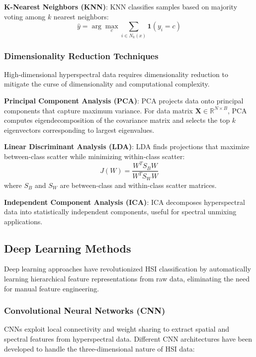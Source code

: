 \documentclass[journal]{IEEEtran}
\begin{document}
\textbf{K-Nearest Neighbors (KNN)}: KNN classifies samples based on majority voting among $k$ nearest neighbors:
\begin{equation}
\hat{y} = \arg\max_{c} \sum_{i \in N_k(x)} \mathbf{1}(y_i = c)
\end{equation}

\subsubsection{Dimensionality Reduction Techniques}

High-dimensional hyperspectral data requires dimensionality reduction to mitigate the curse of dimensionality and computational complexity.

\textbf{Principal Component Analysis (PCA)}: PCA projects data onto principal components that capture maximum variance. For data matrix $\mathbf{X} \in \mathbb{R}^{N \times B}$, PCA computes eigendecomposition of the covariance matrix and selects the top $k$ eigenvectors corresponding to largest eigenvalues.

\textbf{Linear Discriminant Analysis (LDA)}: LDA finds projections that maximize between-class scatter while minimizing within-class scatter:
\begin{equation}
J(W) = \frac{W^T S_B W}{W^T S_W W}
\end{equation}
where $S_B$ and $S_W$ are between-class and within-class scatter matrices.

\textbf{Independent Component Analysis (ICA)}: ICA decomposes hyperspectral data into statistically independent components, useful for spectral unmixing applications.

\subsection{Deep Learning Methods}

Deep learning approaches have revolutionized HSI classification by automatically learning hierarchical feature representations from raw data, eliminating the need for manual feature engineering.

\subsubsection{Convolutional Neural Networks (CNN)}

CNNs exploit local connectivity and weight sharing to extract spatial and spectral features from hyperspectral data. Different CNN architectures have been developed to handle the three-dimensional nature of HSI data:
\end{document}
